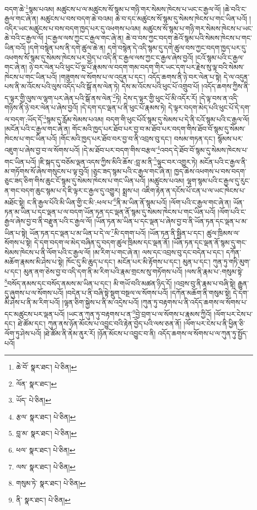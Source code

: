 བདག་ཆེ་\footnote{ཆེ་བོ་  སྣར་ཐང་།  པེ་ཅིན། }སྙམ་པའམ། མཚུངས་པ་ལ་མཚུངས་སོ་སྙམ་པ་གཉི་གར་སེམས་ཁེངས་པ་ཡང་ང་རྒྱལ་ལོ། །ཆེ་བའི་ང་རྒྱལ་གང་ཞེ་ན། མཚུངས་པ་བས་བདག་ཆེ་བའམ། ཆེ་བ་དང་མཚུངས་སོ་སྙམ་དུ་སེམས་ཁེངས་པ་གང་ཡིན་པའོ། །འདིར་ཡང་མཚུངས་པ་བས་བདག་ཁྱད་པར་དུ་འཕགས་པའམ། མཚུངས་སོ་སྙམ་པ་གཉི་གར་སེམས་ཁེངས་པ་ཡང་ཆེ་བའི་ང་རྒྱལ་ལོ། །ང་རྒྱལ་ལས་ཀྱང་ང་རྒྱལ་གང་ཞེ་ན། ཆེ་བ་བས་ཀྱང་བདག་ཆེའོ་སྙམ་པའི་སེམས་ཁེངས་པ་གང་ཡིན་བའོ། །དགེ་བསྙེན་པས་ནི་དགེ་ཚུལ་ཆེ་ན། དགེ་བསྙེན་དེ་འདི་སྙམ་དུ་དགེ་ཚུལ་བས་ཀྱང་བདག་ཁྱད་པར་དུ་འཕགས་སོ་སྙམ་དུ་སེམས་ཁེངས་པར་བྱེད་པ་འདི་ནི་ང་རྒྱལ་ལས་ཀྱང་ང་རྒྱལ་ཞེས་བྱའོ། །ངའོ་སྙམ་པའི་ང་རྒྱལ་གང་ཞེ་ན། ཉེ་བར་ལེན་པའི་ཕུང་པོ་ལྔ་པོ་རྣམས་ལ་བདག་གམ་བདག་གིར་ཡང་དག་པར་རྗེས་སུ་ལྟ་བའི་སེམས་ཁེངས་པ་གང་ཡིན་པའོ། །གཟུགས་ལ་སོགས་པ་ལ་འདུན་པ་དང་། འདོད་ཆགས་ནི་ཉེ་བར་ལེན་པ་སྟེ། དེ་ལ་འདུན་པས་ནི་མ་འོངས་པའི་ལུས་འདོད་པའི་སྒོ་ནས་ལེན་ཏེ། དེས་མ་འོངས་པའི་ཕུང་པོ་འགྲུབ་པོ། །འདོད་ཆགས་ཀྱིས་ནི་ད་ལྟར་གྱི་ལུས་ལ་ལྷག་པར་ཞེན་པའི་སྒོ་ནས་ལེན་\footnote{ལོན་  སྣར་ཐང་། }ཏེ། དེས་ད་ལྟར་གྱི་ཕུང་པོ་མི་འདོར་རོ། །དེ་ལྟ་བས་ན་འདི་གཉིས་ནི་ཉེ་བར་ལེན་པ་ཞེས་བྱའོ། །དེ་དག་དང་ལྡན་པ་ནི་ཕུང་པོ་རྣམས་ཏེ། དེ་ལྟར་བདག་མེད་པའི་ཕུང་པོ་དེ་དག་ལ་བདག་:ཡོད་དོ་\footnote{ཡོད་  པེ་ཅིན། }སྙམ་དུ་རློམ་སེམས་པའམ། བདག་གི་ཕུང་པོའོ་སྙམ་དུ་སེམས་པ་དེ་ནི་ངའོ་སྙམ་པའི་ང་རྒྱལ་ལོ། །མངོན་པའི་ང་རྒྱལ་གང་ཞེ་ན། གོང་མའི་ཁྱད་པར་ཐོབ་པར་བྱ་བ་མ་ཐོབ་པར་བདག་གིས་ཐོབ་བོ་སྙམ་དུ་སེམས་ཁེངས་པ་གང་ཡིན་པའོ། །གོང་མའི་ཁྱད་པར་ཐོབ་བར་བྱ་བ་ནི་འབྲས་བུ་དང་། བསམ་གཏན་དང་། སྙོམས་པར་འཇུག་པ་ཞེས་བྱ་བ་ལ་སོགས་པའོ། །དེ་མ་ཐོབ་པར་བདག་གིས་བརྩལ་\footnote{རྩལ་  སྣར་ཐང་།  པེ་ཅིན། }འབད་དེ་ཐོབ་བོ་སྙམ་དུ་སེམས་ཁེངས་པ་གང་ཡིན་པའོ། །ཇི་སྐད་དུ་བཅོམ་ལྡན་འདས་ཀྱིས་མིའི་ཆོས་:བླ་མ་ནི་\footnote{བླ་མ་  སྣར་ཐང་།  པེ་ཅིན། }ལྟུང་བར་འགྱུར་ཏེ། མངོན་པའི་ང་རྒྱལ་ནི་མ་གཏོགས་སོ་ཞེས་གསུངས་པ་ལྟ་བུའོ། །ཅུང་ཟད་སྙམ་པའི་ང་རྒྱལ་གང་ཞེ་ན། ཁྱད་ཆེས་འཕགས་པ་བས་བདག་ཅུང་ཟད་ཅིག་གིས་ཆུང་ངོ་སྙམ་དུ་སེམས་ཁེངས་པ་གང་ཡིན་པའོ། །མཚུངས་པའམ། ལྷག་སྙམ་པའི་ང་རྒྱལ་དུ་རུང་ན་གང་བདག་ཆུང་སྙམ་པ་དེ་ཇི་ལྟར་ང་རྒྱལ་དུ་འགྱུར། སྨྲས་པ། འཇིག་རྟེན་ན་དངོས་པོ་ངན་པ་ལ་ཡང་ཁེངས་པ་མཐོང་སྟེ། ང་ནི་རྒྱལ་པོའི་མི་ཡིན་གྱི་ང་མི་:ཕལ་པ་\footnote{ཕལ་  སྣར་ཐང་།  པེ་ཅིན། }ནི་མ་ཡིན་ནོ་སྙམ་པའོ། །ལོག་པའི་ང་རྒྱལ་གང་ཞེ་ན། ཡོན་ཏན་མ་ཡིན་པ་དང་ལྡན་པ་ལ་བདག་ཡོན་ཏན་དང་ལྡན་ནོ་སྙམ་དུ་སེམས་ཁེངས་པ་གང་ཡིན་པའོ། །ལོག་པའི་ང་རྒྱལ་ཞེས་བྱ་བ་ནི་བརྫུན་པའི་ང་རྒྱལ་ལོ། །ཡོན་ཏན་མ་ཡིན་པ་དང་ལྡན་པ་ཞེས་བྱ་བ་ནི་ཡོན་ཏན་དང་ལྡན་པ་མ་ཡིན་པ་སྟེ། ཡོན་ཏན་དང་ལྡན་པ་མ་ཡིན་པ་དེ་ལ་\footnote{ལས་  སྣར་ཐང་།  པེ་ཅིན། }མི་དགག་པའོ། །ཡོན་ཏན་ནི་སྦྱིན་པ་དང་། ཚུལ་ཁྲིམས་ལ་སོགས་པ་སྟེ། དེ་དག་བདག་ལ་མེད་བཞིན་དུ་བདག་ཚུལ་ཁྲིམས་དང་ལྡན་ནོ། །ཡོན་ཏན་དང་ལྡན་ནོ་སྙམ་དུ་གང་སེམས་ཁེངས་པ་ནི་ལོག་པའི་ང་རྒྱལ་ལོ། །མ་རིག་པ་གང་ཞེ་ན། ལས་དང་འབྲས་བུ་དང་བདེན་པ་དང་། དཀོན་མཆོག་རྣམས་མི་ཤེས་པ་སྟེ། ཁོང་དུ་མི་ཆུད་པ་དང་། མངོན་པར་མི་རྟོགས་པ་དང་། མུན་པ་དང་། ཀུན་ཏུ་གཏི་མུག་པ་དང་། མུན་ནག་ཅེས་བྱ་བ་འདི་དག་ནི་མ་རིག་པའི་རྣམ་གྲངས་སུ་གཏོགས་པའོ། །ལས་ནི་རྣམ་པ་:གསུམ་སྟེ་\footnote{གསུམ་ཏེ་  སྣར་ཐང་།  པེ་ཅིན། }བསོད་ནམས་དང་བསོད་ནམས་མ་ཡིན་པ་དང་། མི་གཡོ་བའི་མཚན་ཉིད་དོ། །འབྲས་བུ་ནི་རྣམ་པ་བཞི་སྟེ། རྒྱུན་དུ་ཞུགས་པ་ལ་སོགས་པའོ། །བདེན་པ་ནི་བཞི་སྟེ་སྡུག་བསྔལ་ལ་སོགས་པའོ། །དཀོན་མཆོག་ནི་གསུམ་སྟེ། དེ་དག་མི་ཤེས་པ་ནི་མ་རིག་པའོ། །ལྷན་ཅིག་སྐྱེས་པ་ནི་མ་འདྲེས་པའོ། །ཀུན་ཏུ་བརྟགས་པ་ནི་འདོད་ཆགས་ལ་སོགས་པ་དང་མཚུངས་པར་ལྡན་པའོ། །ཡང་ན་ཀུན་ཏུ་བརྟགས་པ་ན་\footnote{ནི་  སྣར་ཐང་།  པེ་ཅིན། }བྱེ་བྲག་པ་ལ་སོགས་པ་རྣམས་ཀྱིའོ། །ལོག་པར་ངེས་པ་དང་། ཐེ་ཚོམ་དང་། ཀུན་ནས་ཉོན་མོངས་པ་འབྱུང་བའི་རྟེན་བྱེད་པའི་ལས་ཅན་ནོ། །ལོག་པར་ངེས་པ་ནི་ཕྱིན་ཅི་ལོག་ཏུ་ཤེས་པའོ། །ཐེ་ཚོམ་ནི་ནེམ་ནུར་རོ། །ཉོན་མོངས་པ་འབྱུང་བ་ནི། འདོད་ཆགས་ལ་སོགས་པ་ལ་ཀུན་ཏུ་སྤྱོད་པའོ། 